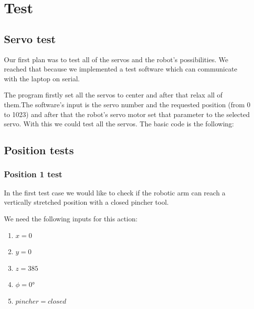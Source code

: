 \chapter{Test}

\label{ch:test}

	\section{Servo test}

	\hspace{15pt}Our first plan was to test all of the servos and the robot's possibilities. We reached that because we implemented a test software which can communicate with the laptop on serial. 
	
	
	The program firstly set all the servos to center and after that relax all of them.The software's input is the servo number and the requested position (from 0 to 1023) and after that the robot's servo motor set that parameter to the selected servo. With this we could test all the servos. The basic code is the following:
	
	
	
	\section{Position tests}
		
		\subsection{Position 1 test}
		
			\hspace{15pt}In the first test case we would like to check if the robotic arm can reach a vertically stretched position with a closed pincher tool.

			We need the following inputs for this action:

			\begin{enumerate}
				\item $x = 0$ \\
				\item $y = 0$ \\
				\item $z = 385$ \\
				\item $\phi = 0°$ \\
				\item $pincher = closed$ \\
			\end{enumerate}

